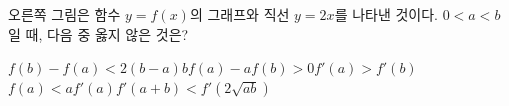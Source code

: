 \noindent\begin{minipage}[t]{0.58\linewidth}\vspace{0pt}\raggedright 오른쪽 그림은 함수 $y=f(x)$의 그래프와 직선 $y=2x$를 나타낸 것이다. $0<a<b$일 때, 다음 중 옳지 않은 것은?\end{minipage}\hfill\begin{minipage}[t]{0.4\linewidth}\vspace{0pt}\centering \resizebox{\ifdim\width>\linewidth\linewidth\else\width\fi}{!}{}\end{minipage}\par
\begin{choicesv}{$f(b)-f(a)<2(b-a)$}{$bf(a)-af(b)>0$}{$f'(a)>f'(b)$}{$f(a)<af'(a)$}{$f'(a+b)<f'(2\sqrt{ab})$}\end{choicesv}
